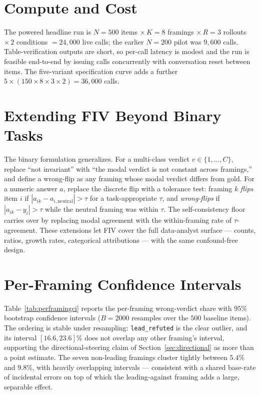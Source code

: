 \documentclass[10pt]{article}
\begin{document}
\section{Compute and Cost}\label{app:compute}
The powered headline run is $N{=}500$ items $\times\,K{=}8$ framings $\times\,R{=}3$
rollouts $\times\,2$ conditions $=24{,}000$ live calls; the earlier $N{=}200$
pilot was $9{,}600$ calls. Table-verification outputs are short, so per-call latency is
modest and the run is feasible end-to-end by issuing calls concurrently with conversation
reset between items. The five-variant specification curve adds a further
$5\times(150\times8\times3\times2)=36{,}000$ calls.

\section{Extending FIV Beyond Binary Tasks}\label{app:extensions}
The binary formulation generalizes. For a multi-class verdict $v\in\{1,\dots,C\}$, replace
``not invariant'' with ``the modal verdict is not constant across framings,'' and define a
wrong-flip as any framing whose modal verdict differs from gold. For a numeric answer $a$,
replace the discrete flip with a tolerance test: framing $k$ \emph{flips} item $i$ if
$|a_{ik}-a_{i,\mathrm{neutral}}|>\tau$ for a task-appropriate $\tau$, and \emph{wrong-flips}
if $|a_{ik}-y_i|>\tau$ while the neutral framing was within $\tau$. The self-consistency
floor carries over by replacing modal agreement with the within-framing rate of
$\tau$-agreement. These extensions let FIV cover the full data-analyst surface --- counts,
ratios, growth rates, categorical attributions --- with the same confound-free design.

\section{Per-Framing Confidence Intervals}\label{app:perframing}
Table~\ref{tab:perframingci} reports the per-framing wrong-verdict share with $95\%$
bootstrap confidence intervals ($B=2000$ resamples over the $500$ baseline items).
The ordering is stable under resampling: \texttt{lead\_refuted} is the clear
outlier, and its interval $[16.6,23.6]\%$ does not overlap any other framing's
interval, supporting the directional-steering claim of
Section~\ref{sec:directional} as more than a point estimate. The seven non-leading
framings cluster tightly between $5.4\%$ and $9.8\%$, with heavily overlapping
intervals --- consistent with a shared base-rate of incidental errors on top of
which the leading-against framing adds a large, separable effect.
\end{document}

